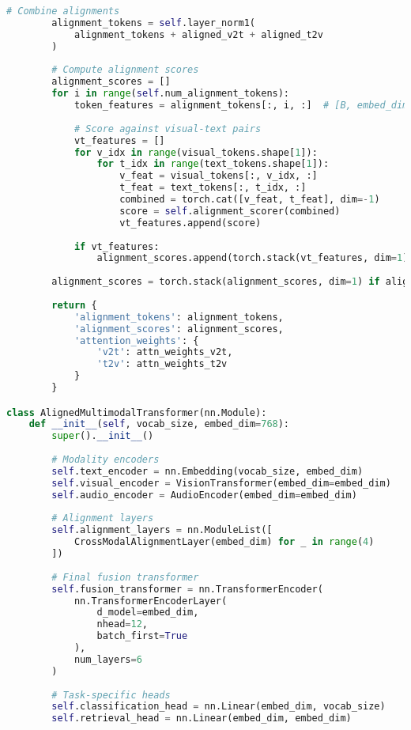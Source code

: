 \begin{lstlisting}[language=Python, caption=Cross-modal alignment architecture]
        # Combine alignments
        alignment_tokens = self.layer_norm1(
            alignment_tokens + aligned_v2t + aligned_t2v
        )
        
        # Compute alignment scores
        alignment_scores = []
        for i in range(self.num_alignment_tokens):
            token_features = alignment_tokens[:, i, :]  # [B, embed_dim]
            
            # Score against visual-text pairs
            vt_features = []
            for v_idx in range(visual_tokens.shape[1]):
                for t_idx in range(text_tokens.shape[1]):
                    v_feat = visual_tokens[:, v_idx, :]
                    t_feat = text_tokens[:, t_idx, :]
                    combined = torch.cat([v_feat, t_feat], dim=-1)
                    score = self.alignment_scorer(combined)
                    vt_features.append(score)
            
            if vt_features:
                alignment_scores.append(torch.stack(vt_features, dim=1))
        
        alignment_scores = torch.stack(alignment_scores, dim=1) if alignment_scores else None
        
        return {
            'alignment_tokens': alignment_tokens,
            'alignment_scores': alignment_scores,
            'attention_weights': {
                'v2t': attn_weights_v2t,
                't2v': attn_weights_t2v
            }
        }

class AlignedMultimodalTransformer(nn.Module):
    def __init__(self, vocab_size, embed_dim=768):
        super().__init__()
        
        # Modality encoders
        self.text_encoder = nn.Embedding(vocab_size, embed_dim)
        self.visual_encoder = VisionTransformer(embed_dim=embed_dim)
        self.audio_encoder = AudioEncoder(embed_dim=embed_dim)
        
        # Alignment layers
        self.alignment_layers = nn.ModuleList([
            CrossModalAlignmentLayer(embed_dim) for _ in range(4)
        ])
        
        # Final fusion transformer
        self.fusion_transformer = nn.TransformerEncoder(
            nn.TransformerEncoderLayer(
                d_model=embed_dim,
                nhead=12,
                batch_first=True
            ),
            num_layers=6
        )
        
        # Task-specific heads
        self.classification_head = nn.Linear(embed_dim, vocab_size)
        self.retrieval_head = nn.Linear(embed_dim, embed_dim)
    

\end{lstlisting}
